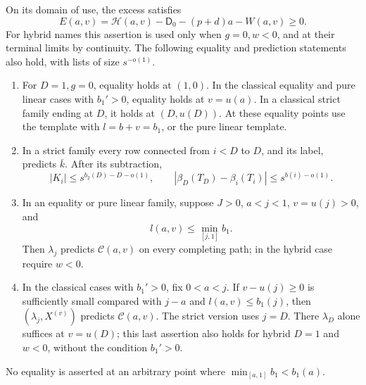 \begin{proposition}
\label{names:canonical-entropy}
On its domain of use, the excess satisfies
\begin{equation}
 E(a,v)=\mathcal H(a,v)-\mathsf D_0-(p+d)a-W(a,v)\geq0.
 \tag{canon}\label{eq:canon}
\end{equation}
For hybrid names this assertion is used only when \(g=0,w<0\), and
at their terminal limits by continuity. The following equality and
prediction statements also hold, with lists of size \(s^{-o(1)}\).
\begin{enumerate}[label=(\roman*)]
\item For \(D=1,g=0\), equality holds at \((1,0)\). In the
classical equality and pure linear cases with \(b_1'>0\), equality
holds at \(v=u(a)\). In a classical strict family ending at \(D\),
it holds at \((D,u(D))\). At these equality points use the template
with \(l=b+v=b_1\), or the pure linear template.
\item In a strict family every row connected from \(i<D\) to \(D\),
and its label, predicts \(\bar k\). After its subtraction,
\[
 |K_i|\leq s^{b_2(D)-D-o(1)},\qquad
 |\beta_D(T_D)-\beta_i(T_i)|\leq s^{b(i)-o(1)}.
\]
\item In an equality or pure linear family, suppose
\(J>0\), \(a<j<1\), \(v=u(j)>0\), and
\[
 l(a,v)\leq\min_{[j,1]}b_1.
\]
Then \(\lambda_j\) predicts \(\mathcal C(a,v)\) on every completing
path; in the hybrid case require \(w<0\).
\item In the classical cases with \(b_1'>0\), fix \(0<a<j\).
If \(v-u(j)\geq0\) is sufficiently small compared with \(j-a\)
and \(l(a,v)\leq b_1(j)\), then
\((\lambda_j,X^{(v)})\) predicts \(\mathcal C(a,v)\).
The strict version uses \(j=D\). There \(\lambda_D\) alone suffices
at \(v=u(D)\); this last assertion also holds for hybrid \(D=1\)
and \(w<0\), without the condition \(b_1'>0\).
\end{enumerate}
No equality is asserted at an arbitrary point where
\(\min_{[a,1]}b_1<b_1(a)\).
\end{proposition}


